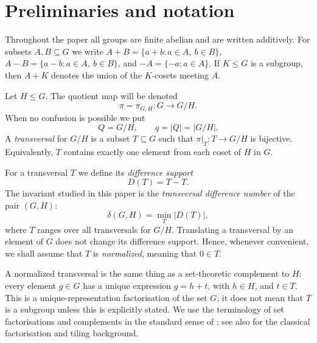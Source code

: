 \documentclass[reqno]{amsart}
\numberwithin{equation}{section}
\theoremstyle{definition}
\begin{document}
\section{Preliminaries and notation}
\label{sec:preliminaries}

Throughout the paper all groups are finite abelian and are written additively.
For subsets $A,B\subseteq G$ we write
$
  A+B=\{a+b:a\in A,\ b\in B\}$,
$A-B=\{a-b:a\in A,\ b\in B\}$,
and $-A=\{-a:a\in A\}$.  If $K\leq G$ is a subgroup, then $A+K$ denotes
the union of the $K$-cosets meeting $A$. 


Let $H\leq G$.  The quotient map will be denoted
\[
  \pi=\pi_{G,H}:G\longrightarrow G/H.
\]
When no confusion is possible we put
\[
  Q=G/H,\qquad q=|Q|=|G/H|.
\]
A \emph{transversal} for $G/H$ is a subset $T\subseteq G$ such that
$\pi|_T:T\to G/H$ is bijective.  Equivalently, $T$ contains exactly one element
from each coset of $H$ in $G$.

For a transversal $T$ we define its \emph{difference support}
\[
  D(T)=T-T.
\]
The invariant studied in this paper is the \emph{transversal difference number}
of the pair $(G,H)$:
\begin{equation} \label{eq:deltainv}
  \delta(G,H)=\min_T |D(T)|,
\end{equation}
where $T$ ranges over all transversals for $G/H$.  Translating a transversal by
an element of $G$ does not change its difference support.  Hence, whenever
convenient, we shall assume that $T$ is \emph{normalized}, meaning that
$0\in T$.

A normalized transversal is the same thing as a set-theoretic complement to
$H$: every element $g\in G$ has a unique expression
$g=h+t$,
  with $h\in H$, and $t\in T$.
This is a unique-representation factorisation of the set $G$; it does not mean
that $T$ is a subgroup unless this is explicitly stated. We use the terminology of set factorisations and complements in the
standard sense of \cite{SzaboSands2009FactoringGroups}; see also \cites{Hajos1942,Redei1965,Stein1974} for the classical factorisation and tiling background.
\end{document}
